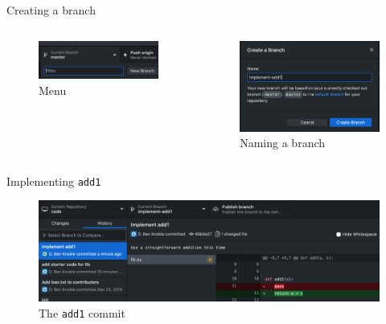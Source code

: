 \documentclass{beamer}
\theoremstyle{example}
\begin{document}
\begin{frame}{Creating a branch}
    \begin{columns}
        \begin{figure}
            \includegraphics[scale=0.4]{img/branch_menu}
            \caption{Menu}
        \end{figure}

        \begin{figure}
            \includegraphics[scale=0.4]{img/create_branch}
            \caption{Naming a branch}
        \end{figure}
    \end{columns}
\end{frame}

\begin{frame}{Implementing \texttt{add1}}
    \begin{figure}
        \includegraphics[scale=0.4]{img/add1}
        \caption{The \texttt{add1} commit}
    \end{figure}
\end{frame}
\end{document}
